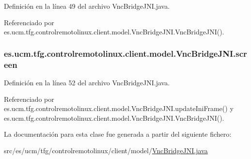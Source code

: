 Definición en la línea 49 del archivo Vnc\-Bridge\-J\-N\-I.\-java.



Referenciado por es.\-ucm.\-tfg.\-controlremotolinux.\-client.\-model.\-Vnc\-Bridge\-J\-N\-I.\-Vnc\-Bridge\-J\-N\-I().

\hypertarget{classes_1_1ucm_1_1tfg_1_1controlremotolinux_1_1client_1_1model_1_1VncBridgeJNI_a4bd641b0970fbe3d8687049f7f65a36b}{
\subsubsection[{screen}]{ es.\-ucm.\-tfg.\-controlremotolinux.\-client.\-model.\-Vnc\-Bridge\-J\-N\-I.\-screen\hspace{0.3cm}{\ttfamily [private]}}}\label{classes_1_1ucm_1_1tfg_1_1controlremotolinux_1_1client_1_1model_1_1VncBridgeJNI_a4bd641b0970fbe3d8687049f7f65a36b}


Definición en la línea 52 del archivo Vnc\-Bridge\-J\-N\-I.\-java.



Referenciado por es.\-ucm.\-tfg.\-controlremotolinux.\-client.\-model.\-Vnc\-Bridge\-J\-N\-I.\-update\-Ini\-Frame() y es.\-ucm.\-tfg.\-controlremotolinux.\-client.\-model.\-Vnc\-Bridge\-J\-N\-I.\-Vnc\-Bridge\-J\-N\-I().



La documentación para esta clase fue generada a partir del siguiente fichero\-:\begin{DoxyCompactItemize}
\item 
src/es/ucm/tfg/controlremotolinux/client/model/\hyperlink{VncBridgeJNI_8java}{Vnc\-Bridge\-J\-N\-I.\-java}\end{DoxyCompactItemize}
